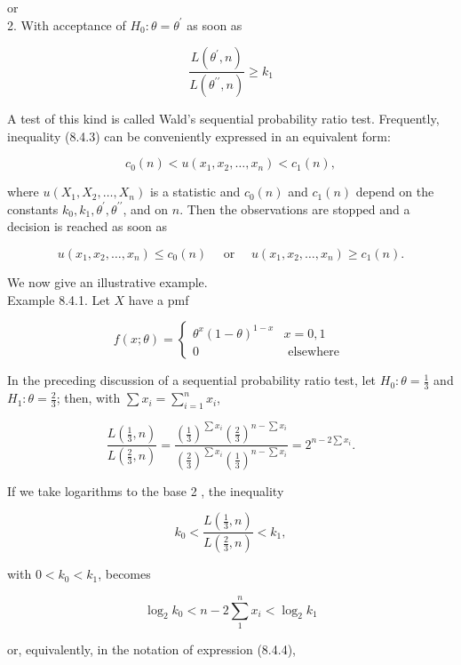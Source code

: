 or\\
2. With acceptance of $H_{0}: \theta=\theta^{\prime}$ as soon as

$$
\frac{L\left(\theta^{\prime}, n\right)}{L\left(\theta^{\prime \prime}, n\right)} \geq k_{1}
$$

A test of this kind is called Wald's sequential probability ratio test. Frequently, inequality (8.4.3) can be conveniently expressed in an equivalent form:


\begin{equation*}
c_{0}(n)<u\left(x_{1}, x_{2}, \ldots, x_{n}\right)<c_{1}(n), \tag{8.4.4}
\end{equation*}


where $u\left(X_{1}, X_{2}, \ldots, X_{n}\right)$ is a statistic and $c_{0}(n)$ and $c_{1}(n)$ depend on the constants $k_{0}, k_{1}, \theta^{\prime}, \theta^{\prime \prime}$, and on $n$. Then the observations are stopped and a decision is reached as soon as

$$
u\left(x_{1}, x_{2}, \ldots, x_{n}\right) \leq c_{0}(n) \quad \text { or } \quad u\left(x_{1}, x_{2}, \ldots, x_{n}\right) \geq c_{1}(n) .
$$

We now give an illustrative example.\\
Example 8.4.1. Let $X$ have a pmf

$$
f(x ; \theta)= \begin{cases}\theta^{x}(1-\theta)^{1-x} & x=0,1 \\ 0 & \text { elsewhere }\end{cases}
$$

In the preceding discussion of a sequential probability ratio test, let $H_{0}: \theta=\frac{1}{3}$ and $H_{1}: \theta=\frac{2}{3}$; then, with $\sum x_{i}=\sum_{i=1}^{n} x_{i}$,

$$
\frac{L\left(\frac{1}{3}, n\right)}{L\left(\frac{2}{3}, n\right)}=\frac{\left(\frac{1}{3}\right)^{\sum x_{i}}\left(\frac{2}{3}\right)^{n-\sum x_{i}}}{\left(\frac{2}{3}\right)^{\sum x_{i}}\left(\frac{1}{3}\right)^{n-\sum x_{i}}}=2^{n-2 \sum x_{i}} .
$$

If we take logarithms to the base 2 , the inequality

$$
k_{0}<\frac{L\left(\frac{1}{3}, n\right)}{L\left(\frac{2}{3}, n\right)}<k_{1},
$$

with $0<k_{0}<k_{1}$, becomes

$$
\log _{2} k_{0}<n-2 \sum_{1}^{n} x_{i}<\log _{2} k_{1}
$$

or, equivalently, in the notation of expression (8.4.4),

